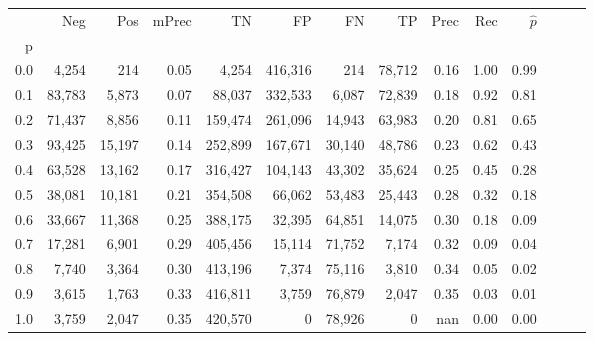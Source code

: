 \begin{tabular}{rrrrrrrrrrrrrr}
\toprule
{} &     Neg &     Pos & mPrec &       TN &       FP &      FN &      TP &  Prec &   Rec & $\hat{p}$ \\
p   &         &         &       &          &          &         &         &       &       &           \\
\midrule
0.0 &   4,254 &     214 &  0.05 &    4,254 &  416,316 &     214 &  78,712 &  0.16 &  1.00 &      0.99 \\
0.1 &  83,783 &   5,873 &  0.07 &   88,037 &  332,533 &   6,087 &  72,839 &  0.18 &  0.92 &      0.81 \\
0.2 &  71,437 &   8,856 &  0.11 &  159,474 &  261,096 &  14,943 &  63,983 &  0.20 &  0.81 &      0.65 \\
0.3 &  93,425 &  15,197 &  0.14 &  252,899 &  167,671 &  30,140 &  48,786 &  0.23 &  0.62 &      0.43 \\
0.4 &  63,528 &  13,162 &  0.17 &  316,427 &  104,143 &  43,302 &  35,624 &  0.25 &  0.45 &      0.28 \\
0.5 &  38,081 &  10,181 &  0.21 &  354,508 &   66,062 &  53,483 &  25,443 &  0.28 &  0.32 &      0.18 \\
0.6 &  33,667 &  11,368 &  0.25 &  388,175 &   32,395 &  64,851 &  14,075 &  0.30 &  0.18 &      0.09 \\
0.7 &  17,281 &   6,901 &  0.29 &  405,456 &   15,114 &  71,752 &   7,174 &  0.32 &  0.09 &      0.04 \\
0.8 &   7,740 &   3,364 &  0.30 &  413,196 &    7,374 &  75,116 &   3,810 &  0.34 &  0.05 &      0.02 \\
0.9 &   3,615 &   1,763 &  0.33 &  416,811 &    3,759 &  76,879 &   2,047 &  0.35 &  0.03 &      0.01 \\
1.0 &   3,759 &   2,047 &  0.35 &  420,570 &        0 &  78,926 &       0 &   nan &  0.00 &      0.00 \\
\bottomrule
\end{tabular}

